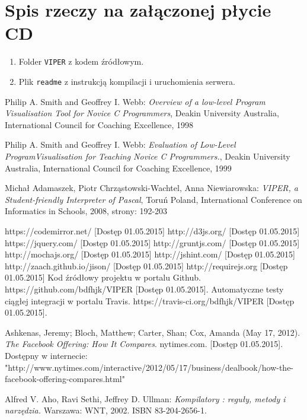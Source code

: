 \documentclass[a4paper,twoside,openright,11pt]{report}
\begin{document}
  \chapter {Spis rzeczy na załączonej płycie CD}
  \begin {enumerate}
    \item Folder \texttt{VIPER} z kodem źródłowym.
    \item Plik \texttt{readme} z instrukcją kompilacji i uruchomienia serwera.
  \end {enumerate}
  
\begin{thebibliography}{99}
  
   Philip A. Smith and Geoffrey I. Webb: \emph{Overview of a low-level Program Visualisation Tool for Novice C Programmers}, Deakin University Australia, International Council for Coaching Excellence, 1998 
  
   Philip A. Smith and Geoffrey I. Webb: \emph{Evaluation of Low-Level ProgramVisualisation for Teaching Novice C Programmers.}, Deakin University Australia, International Council for Coaching Excellence, 1999
  
   Michał Adamaszek, Piotr Chrząstowski-Wachtel, Anna Niewiarowska: \emph{VIPER, a Student-friendly Interpreter of Pascal}, Toruń Poland, International Conference on Informatics in Schools, 2008, strony: 192-203 
  
   https://codemirror.net/ [Dostęp 01.05.2015]
   http://d3js.org/ [Dostęp 01.05.2015]
   https://jquery.com/ [Dostęp 01.05.2015]
   http://gruntjs.com/ [Dostęp 01.05.2015]
   http://mochajs.org/ [Dostęp 01.05.2015]
   http://jshint.com/ [Dostęp 01.05.2015]
   http://zaach.github.io/jison/ [Dostęp 01.05.2015]
   http://requirejs.org [Dostęp 01.05.2015]
   Kod źródłowy projektu w portalu Github. https://github.com/bdfhjk/VIPER [Dostęp 01.05.2015]. 
   Automatyczne testy ciągłej integracji w portalu Travis. https://travis-ci.org/bdfhjk/VIPER [Dostęp 01.05.2015].

   Ashkenas, Jeremy; Bloch, Matthew; Carter, Shan; Cox, Amanda (May 17, 2012). \emph{The Facebook Offering: How It Compares}. nytimes.com.  [Dostęp 01.05.2015]. Dostępny w internecie: "http://www.nytimes.com/interactive/2012/05/17/business/dealbook/how-the-facebook-offering-compares.html"
  
   Alfred V. Aho, Ravi Sethi, Jeffrey D. Ullman: \emph{Kompilatory : reguły, metody i narzędzia.} Warszawa: WNT, 2002. ISBN 83-204-2656-1.


\end{thebibliography}
\end{document}
